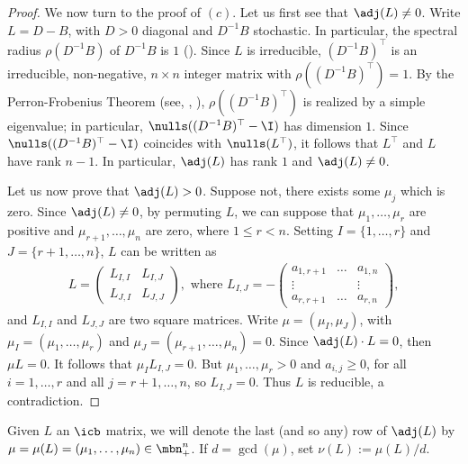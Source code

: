 \begin{proof}
We now turn to the proof of $(c)$. Let us first see that $\adj(L)\neq
0$. Write $L=D-B$, with $D>0$ diagonal and $D^{-1}B$ stochastic. In
particular, the spectral radius $\rho(D^{-1}B)$ of $D^{-1}B$ is $1$
(\cite[Chapter~XIII,~p.~83]{gantmacher}). Since $L$ is irreducible,
$(D^{-1}B)^{\top}$ is an irreducible, non-negative, $n\times n$
integer matrix with $\rho((D^{-1}B)^{\top})=1$. By the
Perron-Frobenius Theorem (see, \eg
\cite[Chapter~XIII,~p.~53]{gantmacher},
\cite[Theorem~8.8.1,~p.~178]{gr}), $\rho((D^{-1}B)^{\top})$ is
realized by a simple eigenvalue; in particular,
$\nulls((D^{-1}B)^{\top}-\I)$ has dimension $1$. Since
$\nulls((D^{-1}B)^{\top}-\I)$ coincides with $\nulls(L^{\top})$, it
follows that $L^{\top}$ and $L$ have rank $n-1$. In particular,
$\adj(L)$ has rank $1$ and $\adj(L)\neq 0$.

Let us now prove that $\adj(L)>0$. Suppose not, \ie there exists
some $\mu_j$ which is zero. Since $\adj(L)\neq 0$, by permuting $L$,
we can suppose that $\mu_1,\ldots ,\mu_r$ are positive and
$\mu_{r+1},\ldots ,\mu_n$ are zero, where $1\leq r<n$. Setting
$I=\{1,\ldots ,r\}$ and $J=\{r+1,\ldots ,n\}$, $L$ can be written as
\begin{eqnarray*}
L=\left(\begin{array}{cc}
L_{I,I}&L_{I,J}\\L_{J,I}&L_{J,J}
\end{array}\right),\mbox{ where }
L_{I,J}=-\left(\begin{array}{ccc}
a_{1,r+1}&\ldots &a_{1,n}\\\vdots&&\vdots\\a_{r,r+1}&\ldots &a_{r,n}
\end{array}\right),
\end{eqnarray*}
and $L_{I,I}$ and $L_{J,J}$ are two square matrices. Write
$\mu=(\mu_I,\mu_J)$, with $\mu_I=(\mu_1,\ldots ,\mu_r)$ and
$\mu_J=(\mu_{r+1},\ldots ,\mu_n)=0$. Since $\adj(L)\cdot L=0$, then
$\mu L=0$. It follows that $\mu_IL_{I,J}=0$. But $\mu_1,\ldots
,\mu_r>0$ and $a_{i,j}\geq 0$, for all $i=1,\ldots ,r$ and all
$j=r+1,\ldots, n$, so $L_{I,J}=0$. Thus $L$ is reducible, a
contradiction.
\end{proof}

\begin{notation}\label{vectornu}
Given $L$ an $\icb$ matrix, we will denote the last (and so any) row of
$\adj(L)$ by $\mu=\mu(L)=(\mu_1,\ldots ,\mu_n)\in\mbn^n_{+}$.  If
$d=\gcd(\mu)$, set $\nu(L):=\mu(L)/d$.
\end{notation}

